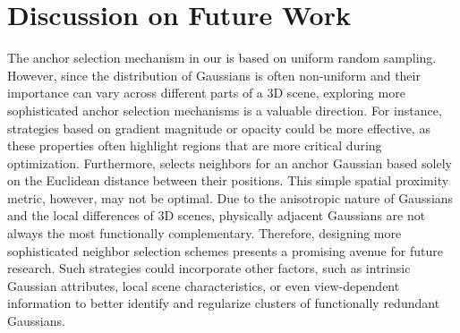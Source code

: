 \section{Discussion on Future Work}
The anchor selection mechanism in our \methodname{} is based on uniform random sampling. However, since the distribution of Gaussians is often non-uniform and their importance can vary across different parts of a 3D scene, exploring more sophisticated anchor selection mechanisms is a valuable direction. For instance, strategies based on gradient magnitude or opacity could be more effective, as these properties often highlight regions that are more critical during optimization. 
% 
Furthermore, \methodname{} selects neighbors for an anchor Gaussian based solely on the Euclidean distance between their positions. This simple spatial proximity metric, however, may not be optimal. Due to the anisotropic nature of Gaussians and the local differences of 3D scenes, physically adjacent Gaussians are not always the most functionally complementary. Therefore, designing more sophisticated neighbor selection schemes presents a promising avenue for future research. Such strategies could incorporate other factors, such as intrinsic Gaussian attributes, local scene characteristics, or even view-dependent information to better identify and regularize clusters of functionally redundant Gaussians.


\begin{table}[t]
  \centering
  \caption{\textbf{Quantitative comparison on the MipNeRF-360 dataset (12 views)}. SH\textsubscript{\textit{n}} denotes retaining only the first \textit{n} degrees of SH coefficients during inference.}
  \resizebox{1.\linewidth}{!}{
    
    }
\label{tab:compare_mip}%
\end{table}

\begin{table}[t]
  \centering
   \caption{\textbf{Quantitative comparison on the Blender dataset (8 views)}. SH\textsubscript{\textit{n}} denotes retaining only the first \textit{n} degrees of SH coefficients during inference.}
  \resizebox{1.\linewidth}{!}{
    
    }
\label{tab:compare_blender}%
\end{table}


